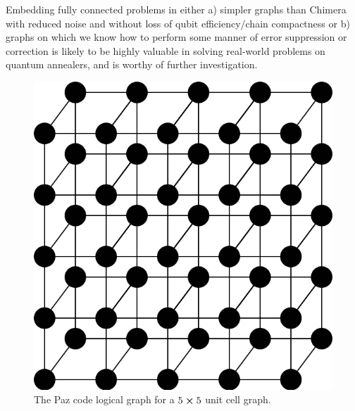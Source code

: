 \documentclass[superscriptaddress,showpacs,reprint]{revtex4-1}
\begin{document}
Embedding fully connected problems in either a) simpler graphs than Chimera with reduced noise and without loss of qubit efficiency/chain compactness or b) graphs on which we know how to perform some manner of error suppression or correction is likely to be highly valuable in solving real-world problems on quantum annealers, and is worthy of further investigation. 

\begin{figure}[hbt]
  \includegraphics[width=\textwidth/2]{2lsl}
  \caption{The Paz code logical graph for a $5\cross 5$ unit cell graph.}
  \label{fig:gpg}
\end{figure}
\end{document}
